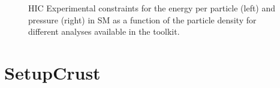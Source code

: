 \documentclass[letterpaper,10pt,english]{sphinxmanual}
\begin{document}
\begin{figure}[htbp]
\centering
\capstart

\noindent{}
\caption{HIC Experimental constraints for the energy per particle (left) and pressure (right) in SM as a function of the particle density for different analyses available in the  toolkit.}\label{\detokenize{source/api/setup_hic_matter:id1}}\end{figure}

\sphinxstepscope


\section{SetupCrust}
\label{\detokenize{source/api/setup_crust:setupcrust}}\label{\detokenize{source/api/setup_crust::doc}}\label{\detokenize{source/api/setup_crust:module-nucleardatapy.setup_crust}}
\end{document}

